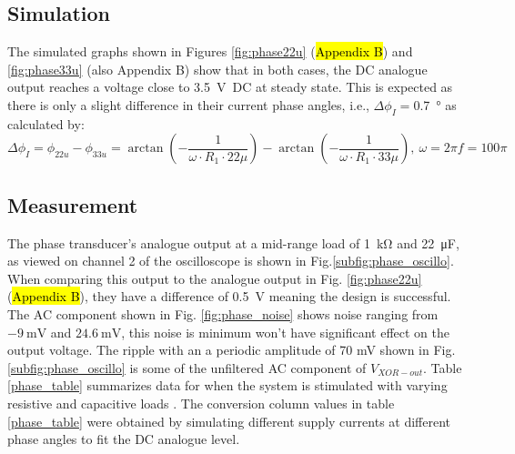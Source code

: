 
\subsection{Simulation} \label{sec:ptrans_simu}

The simulated graphs shown in Figures \ref{fig:phase22u} (\hl{Appendix B}) and \ref{fig:phase33u} (also Appendix B) show that in both cases, the DC analogue output reaches a voltage close to \SI{3.5}{\volt DC} at steady state. This is expected as there is only a slight difference in their current phase angles, i.e., $\Delta\phi_{I}=$\SI{0.7}{\degree} as calculated by: 
$$\Delta\phi_{I}=\phi_{22u}-\phi_{33u}=\arctan(-\frac{1}{\omega\cdot R_1 \cdot 22\mu})-\arctan(-\frac{1}{\omega\cdot R_1 \cdot 33\mu}), \ \omega=2 \pi f=100 \pi$$


\subsection{Measurement} \label{sec:ptrans_meas}

 The phase transducer's analogue output at a mid-range load of \SI{1}{\kilo\ohm} and \SI{22}{\micro\farad}, as viewed on channel 2 of the oscilloscope is shown in Fig.\ref{subfig:phase_oscillo}. When comparing this output to the analogue output in Fig. \ref{fig:phase22u} (\hl{Appendix B}), they have a difference of \SI{0.5}{V} meaning the design is successful. The AC component shown in Fig. \ref{fig:phase_noise} shows noise ranging from $\SI{-9}{\milli \volt}$ and $\SI{24.6}{\milli \volt}$, this noise is minimum won't have significant effect on the output voltage. The ripple with an a periodic amplitude of 70 mV shown in Fig. \ref{subfig:phase_oscillo} is some of the unfiltered AC component of $V_{XOR-out}$. Table \ref{phase_table} summarizes data for when the system is stimulated with varying resistive and capacitive loads \cite{assignment_2}.  The conversion column values in table \ref{phase_table} were obtained by simulating different supply currents at different phase angles to fit the DC analogue level.

